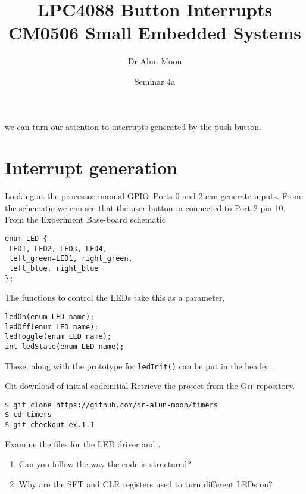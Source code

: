 \documentclass[a4paper]{tufte-handout}
\title{LPC4088 Button Interrupts\\\small{CM0506 Small Embedded Systems}}
\author{Dr Alun Moon}
\date{Seminar 4a}
\begin{document}
\maketitle
{}  we can
turn our attention to interrupts generated by the push button.

\section{Interrupt generation}
Looking at the processor manual \citep[section 8.2.2, pg144]{lpc4088}
GPIO~Ports 0 and 2 can generate inputs.  From the schematic
\citep{quickstart} we can see that the user button in connected to
Port 2 pin 10.  From the Experiment Base-board schematic
\citep{baseboard} 
\begin{verbatim}
enum LED {
 LED1, LED2, LED3, LED4,
 left_green=LED1, right_green,
 left_blue, right_blue
};
\end{verbatim}
The functions to control the LEDs take this as a parameter,
\begin{verbatim}
ledOn(enum LED name);
ledOff(enum LED name);
ledToggle(enum LED name);
int ledState(enum LED name);
\end{verbatim}

These, along with the prototype for \verb'ledInit()' can be put in the
header .


\begin{exercise}{Git download of initial code}{initial}
    Retrieve the project from the \textsc{Git} repository.
\begin{verbatim}
$ git clone https://github.com/dr-alun-moon/timers
$ cd timers
$ git checkout ex.1.1
\end{verbatim}
    Examine the files for the LED driver  and
    .
    \begin{enumerate}
    \item Can you follow the way the code is structured?
    \item Why are the SET and CLR registers used to turn different
      LEDs on?
    \end{enumerate}
  \end{exercise}



\end{document}
